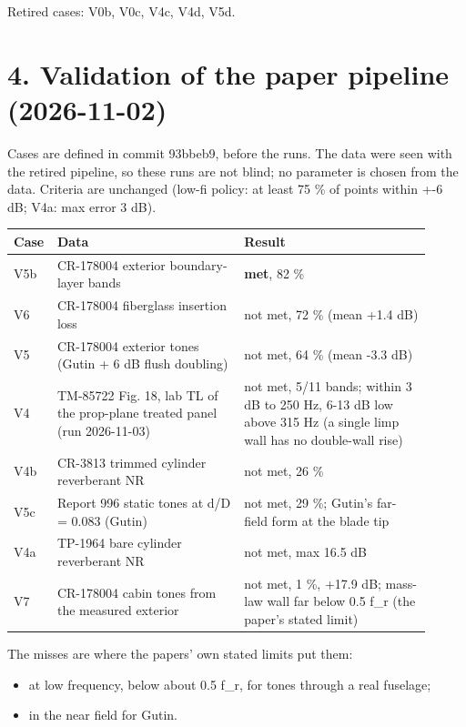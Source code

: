 \documentclass[10pt,a4paper]{article}
\begin{document}
Retired cases: V0b, V0c, V4c, V4d, V5d.

\section*{4. Validation of the paper pipeline (2026-11-02)}

Cases are defined in commit 93bbeb9, before the runs. The data were seen with the retired pipeline, so these runs are not blind; no parameter is chosen from the data. Criteria are unchanged (low-fi policy: at least 75 \% of points within +-6 dB; V4a: max error 3 dB).

{\small
\begin{longtable}{>{\raggedright\arraybackslash}p{0.049\linewidth}>{\raggedright\arraybackslash}p{0.430\linewidth}>{\raggedright\arraybackslash}p{0.430\linewidth}}
\hline
\textbf{Case} & \textbf{Data} & \textbf{Result} \\
\hline
\endhead
V5b & CR-178004 exterior boundary-layer bands & \textbf{met}, 82 \% \\
V6 & CR-178004 fiberglass insertion loss & not met, 72 \% (mean +1.4 dB) \\
V5 & CR-178004 exterior tones (Gutin + 6 dB flush doubling) & not met, 64 \% (mean -3.3 dB) \\
V4 & TM-85722 Fig. 18, lab TL of the prop-plane treated panel (run 2026-11-03) & not met, 5/11 bands; within 3 dB to 250 Hz, 6-13 dB low above 315 Hz (a single limp wall has no double-wall rise) \\
V4b & CR-3813 trimmed cylinder reverberant NR & not met, 26 \% \\
V5c & Report 996 static tones at d/D = 0.083 (Gutin) & not met, 29 \%; Gutin's far-field form at the blade tip \\
V4a & TP-1964 bare cylinder reverberant NR & not met, max 16.5 dB \\
V7 & CR-178004 cabin tones from the measured exterior & not met, 1 \%, +17.9 dB; mass-law wall far below 0.5 f\_r (the paper's stated limit) \\
\hline
\end{longtable}}

The misses are where the papers' own stated limits put them:

\begin{itemize}
\item at low frequency, below about 0.5 f\_r, for tones through a real fuselage;
\item in the near field for Gutin.
\end{itemize}
\end{document}
